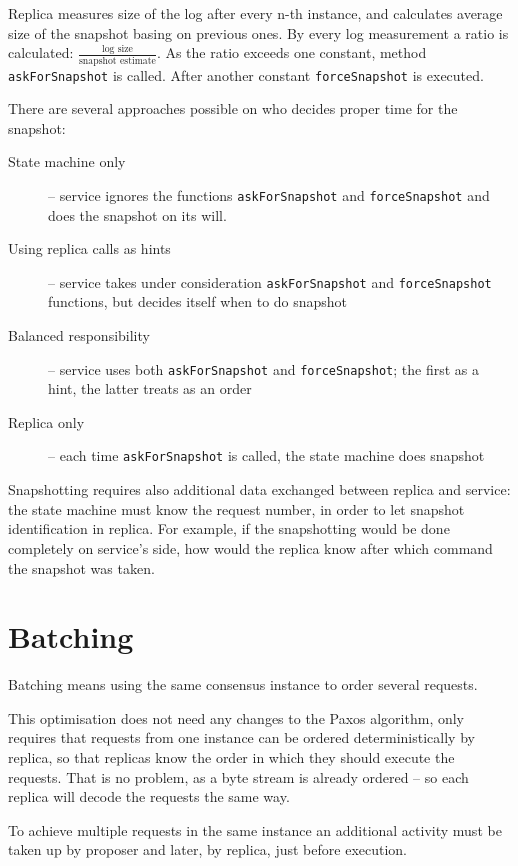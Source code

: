 Replica measures size of the log after every n-th instance, and calculates average size of the snapshot basing on previous ones. By every log measurement a ratio is calculated: $\frac{ \text{log size} }{ \text{snapshot estimate} }$. As the ratio exceeds one constant, method \texttt{askForSnapshot} is called. After another constant \texttt{forceSnapshot} is executed.

There are several approaches possible on who decides proper time for the snapshot:
\begin{description} 
 \item[State machine only] -- service ignores the functions \texttt{askForSnapshot} and \texttt{forceSnap\-shot} and does the snapshot on its will.
 \item[Using replica calls as hints] -- service takes under consideration \texttt{askForSnapshot} and \texttt{fo\-rce\-Snapshot} functions, but decides itself when to do snapshot
 \item[Balanced responsibility] -- service uses both \texttt{askForSnapshot} and \texttt{forceSnapshot}; the first as a hint, the latter treats as an order
 \item[Replica only] -- each time \texttt{askForSnapshot} is called, the state machine does snapshot
\end{description}

Snapshotting requires also additional data exchanged between replica and service: the state machine must know the request number, in order to let snapshot identification in replica. For example, if the snapshotting would be done completely on service's side, how would the replica know after which command the snapshot was taken.


\section{Batching}
\label{sec:batching}
Batching means using the same consensus instance to order several requests.

This optimisation does not need any changes to the Paxos algorithm, only requires that requests from one instance can be ordered deterministically by replica, so that replicas know the order in which they should execute the requests. That is no problem, as a byte stream is already ordered -- so each replica will decode the requests the same way.

To achieve multiple requests in the same instance an additional activity must be taken up by proposer and later, by replica, just before execution.


